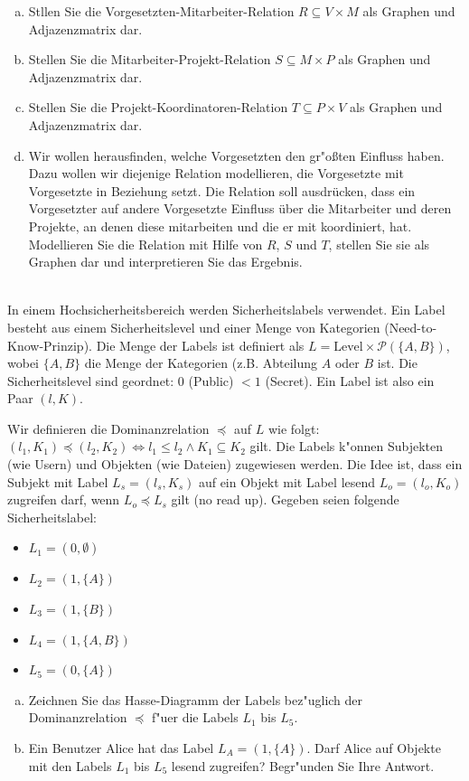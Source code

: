 \begin{enumerate}[(a)]
    \item Stllen Sie die Vorgesetzten-Mitarbeiter-Relation $R\subseteq V\times M$ als Graphen und Adjazenzmatrix dar.
    \item Stellen Sie die Mitarbeiter-Projekt-Relation $S\subseteq M\times P$ als Graphen und Adjazenzmatrix dar.
    \item Stellen Sie die Projekt-Koordinatoren-Relation $T\subseteq P\times V$ als Graphen und Adjazenzmatrix dar.
    \item Wir wollen herausfinden, welche Vorgesetzten den gr"o{\ss}ten Einfluss haben. Dazu wollen wir diejenige Relation modellieren, die Vorgesetzte mit Vorgesetzte in Beziehung setzt. Die Relation soll ausdrücken, dass ein Vorgesetzter auf andere Vorgesetzte Einfluss über die Mitarbeiter und deren Projekte, an denen diese mitarbeiten und die er mit koordiniert, hat. Modellieren Sie die Relation mit Hilfe von $R$, $S$ und $T$, stellen Sie sie als Graphen dar und interpretieren Sie das Ergebnis.
\end{enumerate}


\\
In einem Hochsicherheitsbereich werden Sicherheitslabels verwendet. Ein Label besteht aus einem Sicherheitslevel und einer Menge von Kategorien (Need-to-Know-Prinzip). 
Die Menge der Labels ist definiert als $L=\text{Level}\times\mathcal{P}(\{A,B\})$, wobei $\{A,B\}$ die Menge der Kategorien (z.B. Abteilung $A$ oder $B$ ist.
Die Sicherheitslevel sind geordnet: $0$ (Public) $< 1$ (Secret).
Ein Label ist also ein Paar $(l,K)$. 

Wir definieren die Dominanzrelation $\preceq$ auf $L$ wie folgt: $(l_1,K_1) \preceq (l_2,K_2)\Leftrightarrow l_1 \leq l_2 \wedge K_1 \subseteq K_2$ gilt.
Die Labels k"onnen Subjekten (wie Usern) und Objekten (wie Dateien) zugewiesen werden.
Die Idee ist, dass ein Subjekt mit Label $L_s=(l_s,K_s)$ auf ein Objekt mit Label lesend $L_o=(l_o,K_o)$ zugreifen darf, wenn $L_o \preceq L_s$ gilt (no read up).
Gegeben seien folgende Sicherheitslabel:
\begin{itemize}
    \item $L_1 = (0,\emptyset)$
    \item $L_2 = (1,\{A\})$
    \item $L_3 = (1,\{B\})$
    \item $L_4 = (1,\{A,B\})$
    \item $L_5 = (0,\{A\})$
   
\end{itemize}
\begin{enumerate}[(a)]
    \item Zeichnen Sie das Hasse-Diagramm der Labels bez"uglich der Dominanzrelation $\preceq$ f"uer die Labels $L_1$ bis $L_5$.
    \item Ein Benutzer Alice hat das Label $L_A = (1,\{A\})$. Darf Alice auf Objekte mit den Labels $L_1$ bis $L_5$ lesend zugreifen? Begr"unden Sie Ihre Antwort.
\end{enumerate}


